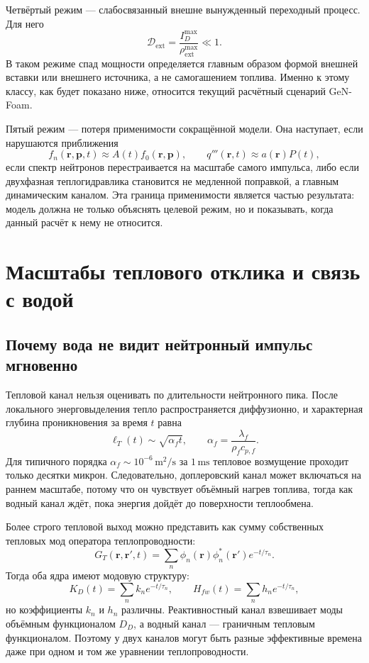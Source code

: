 \documentclass[12pt]{article}
\begin{document}
Четвёртый режим --- слабосвязанный внешне вынужденный переходный процесс. Для него
\[
\mathcal D_{\mathrm{ext}}
=
\frac{I_D^{\max}}{\rho_{\mathrm{ext}}^{\max}}
\ll1.
\]
В таком режиме спад мощности определяется главным образом формой внешней вставки или внешнего источника, а не самогашением топлива. Именно к этому классу, как будет показано ниже, относится текущий расчётный сценарий GeN-Foam.

Пятый режим --- потеря применимости сокращённой модели. Она наступает, если нарушаются приближения
\[
f_n(\mathbf r,\mathbf p,t)\approx A(t)f_0(\mathbf r,\mathbf p),
\qquad
q'''(\mathbf r,t)\approx a(\mathbf r)P(t),
\]
если спектр нейтронов перестраивается на масштабе самого импульса, либо если двухфазная теплогидравлика становится не медленной поправкой, а главным динамическим каналом. Эта граница применимости является частью результата: модель должна не только объяснять целевой режим, но и показывать, когда данный расчёт к нему не относится.

\section{Масштабы теплового отклика и связь с водой}

\subsection{Почему вода не видит нейтронный импульс мгновенно}

Тепловой канал нельзя оценивать по длительности нейтронного пика. После локального энерговыделения тепло распространяется диффузионно, и характерная глубина проникновения за время \(t\) равна
\[
\ell_T(t)\sim\sqrt{\alpha_f t},
\qquad
\alpha_f=\frac{\lambda_f}{\rho_fc_{p,f}}.
\]
Для типичного порядка \(\alpha_f\sim10^{-6}\,\mathrm{m^2/s}\) за \(1\,\mathrm{ms}\) тепловое возмущение проходит только десятки микрон. Следовательно, доплеровский канал может включаться на раннем масштабе, потому что он чувствует объёмный нагрев топлива, тогда как водный канал ждёт, пока энергия дойдёт до поверхности теплообмена.

Более строго тепловой выход можно представить как сумму собственных тепловых мод оператора теплопроводности:
\[
G_T(\mathbf r,\mathbf r',t)
=
\sum_n\phi_n(\mathbf r)\phi_n^*(\mathbf r')e^{-t/\tau_n}.
\]
Тогда оба ядра имеют модовую структуру:
\[
K_D(t)=\sum_n k_ne^{-t/\tau_n},
\qquad
H_{fw}(t)=\sum_n h_ne^{-t/\tau_n},
\]
но коэффициенты \(k_n\) и \(h_n\) различны. Реактивностный канал взвешивает моды объёмным функционалом \(D_D\), а водный канал --- граничным тепловым функционалом. Поэтому у двух каналов могут быть разные эффективные времена даже при одном и том же уравнении теплопроводности.
\end{document}
